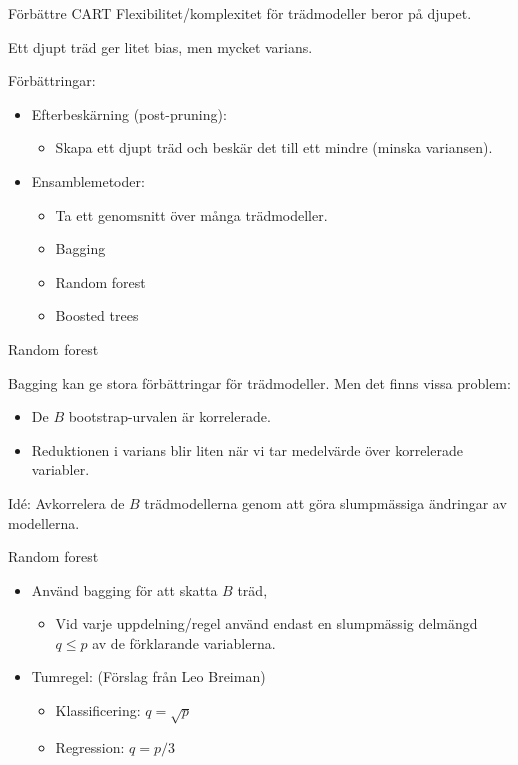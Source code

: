 \documentclass[10pt,english]{beamer}
\begin{document}
\begin{frame}{Förbättre CART}
    Flexibilitet/komplexitet för trädmodeller beror på djupet.
    \begin{redbox}
        Ett djupt träd ger litet bias, men mycket varians.
    \end{redbox}
    
    Förbättringar:
    \begin{itemize}
        \item Efterbeskärning (post-pruning):
        \begin{itemize}
            \item Skapa ett djupt träd och beskär det till ett mindre (minska variansen).
        \end{itemize}
        \item Ensamblemetoder:
        \begin{itemize}
            \item Ta ett genomsnitt över många trädmodeller.
            \item Bagging
            \item Random forest
            \item Boosted trees
        \end{itemize}
    \end{itemize}
\end{frame}

\begin{frame}{Random forest}
    
    Bagging kan ge stora förbättringar för trädmodeller. Men det finns vissa problem:
    \begin{itemize}
        \item De $B$ bootstrap-urvalen är korrelerade.
        \item Reduktionen i varians blir liten när vi tar medelvärde över korrelerade variabler.
    \end{itemize}

    Idé: Avkorrelera de $B$ trädmodellerna genom att göra slumpmässiga ändringar av modellerna.

\end{frame}

\begin{frame}{Random forest}
    
    \begin{itemize}
        \item Använd bagging för att skatta $B$ träd,
        \begin{itemize}
            \item Vid varje uppdelning/regel använd endast en slumpmässig delmängd $q \leq p$ av de förklarande variablerna.
        \end{itemize}
        \item Tumregel: (Förslag från Leo Breiman)
        \begin{itemize}
            \item Klassificering: $q = \sqrt{p}$
            \item Regression: $q = p/3$
        \end{itemize}
    \end{itemize}

\end{frame}
\end{document}

